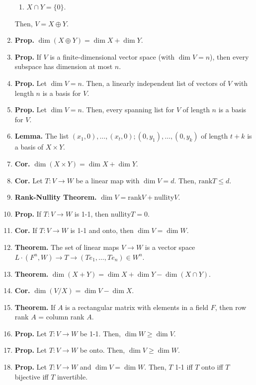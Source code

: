 \begin{enumerate}
\begin{enumerate}
		\item $X \cap Y = \{0\}$. 
	\end{enumerate}
	Then, $V=X \oplus Y$. 
	\item \textbf{Prop. } $\dim(X \oplus Y) = \dim X + \dim Y$. 
	\item \textbf{Prop. } If $V$ is a finite-dimensional vector space (with $\dim V = n$), then every subspace has dimension at most $n$. 
	\item \textbf{Prop. } Let $\dim V = n$. Then, a linearly independent list of vectors of $V$ with length $n$ is a basis for $V$. 
	\item \textbf{Prop. } Let $\dim V = n$. Then, every spanning list for $V$ of length $n$ is a basis for $V$.
	\item \textbf{Lemma. } The list $(x_1,0),\dots,(x_t,0);(0,y_1),\dots,(0,y_k)$ of length $t+k$ is a basis of $X \times Y$. 
	\item \textbf{Cor. } $\dim (X \times Y) = \dim X + \dim Y$. 
	\item \textbf{Cor. } Let $T: V \to W$ be a linear map with $\dim V = d$. Then, $\textrm{rank}T \leq d$. 
	\item \textbf{Rank-Nullity Theorem. } $\dim V = \textrm{rank}V + \textrm{nullity}V$. 
	\item \textbf{Prop. } If $T: V \to W$ is 1-1, then $\textrm{nullity}T = 0$. 
	\item \textbf{Cor. } If $T: V \to W$ is 1-1 and onto, then $\dim V = \dim W$. 
	\item \textbf{Theorem. } The set of linear maps $V \to W$ is a vector space $L \cdot (F^n,W) \to T \longrightarrow (Te_1,\dots,Te_n) \in W^n$. 
	\item \textbf{Theorem. } $\dim (X+Y) = \dim X + \dim Y - \dim (X \cap Y)$. 
	\item \textbf{Cor. } $\dim (V/X) = \dim V - \dim X$. 
	\item \textbf{Theorem. } If $A$ is a rectangular matrix with elements in a field $F$, then row rank $A$ = column rank $A$. 
	\item \textbf{Prop. } Let $T: V \to W$ be 1-1. Then, $\dim W \geq \dim V$. 
	\item \textbf{Prop. } Let $T: V \to W$ be onto. Then, $\dim V \geq \dim W$. 
	\item \textbf{Prop. } Let $T: V \to W$ and $\dim V = \dim W$. Then, $T$ 1-1 iff $T$ onto iff $T$ bijective iff $T$ invertible. 
\end{enumerate}

